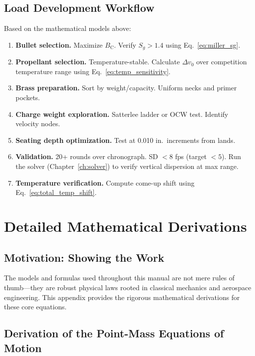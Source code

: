 \documentclass[11pt,twoside,openright]{report}
\newcommand{\Bc}{B_{\mathrm{C}}}
\begin{document}
\section{Load Development Workflow}

Based on the mathematical models above:

\begin{enumerate}[label=\textbf{Step \arabic*:}]
  \item \textbf{Bullet selection.} Maximize $\Bc$. Verify $S_g > 1.4$ using Eq.~\eqref{eq:miller_sg}.
  \item \textbf{Propellant selection.} Temperature-stable. Calculate $\Delta v_0$ over competition temperature range using Eq.~\eqref{eq:temp_sensitivity}.
  \item \textbf{Brass preparation.} Sort by weight/capacity. Uniform necks and primer pockets.
  \item \textbf{Charge weight exploration.} Satterlee ladder or OCW test. Identify velocity nodes.
  \item \textbf{Seating depth optimization.} Test at 0.010 in.\ increments from lands.
  \item \textbf{Validation.} 20+ rounds over chronograph. SD $< 8$ fps (target $< 5$). Run the solver (Chapter~\ref{ch:solver}) to verify vertical dispersion at max range.
  \item \textbf{Temperature verification.} Compute come-up shift using Eq.~\eqref{eq:total_temp_shift}.
\end{enumerate}


\appendix

\chapter{Detailed Mathematical Derivations}
\label{app:derivations}

\section{Motivation: Showing the Work}
The models and formulas used throughout this manual are not mere rules of thumb—they are robust physical laws rooted in classical mechanics and aerospace engineering. This appendix provides the rigorous mathematical derivations for these core equations.

\section{Derivation of the Point-Mass Equations of Motion}
\end{document}
